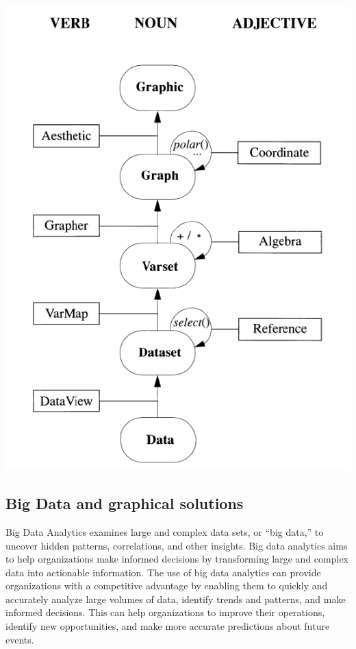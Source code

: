 \documentclass[print]{nuthesis}
\begin{document}
\begin{center}
\includegraphics[width=\textwidth]{figure/graphic-flowchart}
\end{center}

\hypertarget{big-data-and-graphical-solutions}{%
\subsection{Big Data and graphical solutions}\label{big-data-and-graphical-solutions}}

Big Data Analytics examines large and complex data sets, or ``big data,'' to uncover hidden patterns, correlations, and other insights. Big data analytics aims to help organizations make informed decisions by transforming large and complex data into actionable information. The use of big data analytics can provide organizations with a competitive advantage by enabling them to quickly and accurately analyze large volumes of data, identify trends and patterns, and make informed decisions. This can help organizations to improve their operations, identify new opportunities, and make more accurate predictions about future events.
\end{document}
